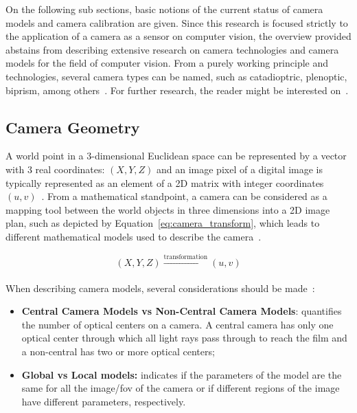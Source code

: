 On the following sub sections, basic notions of the current status of camera models and camera calibration are given. Since this research is focused strictly to the application of a camera as a sensor on computer vision, the overview provided abstains from describing extensive research on camera technologies and camera models for the field of computer vision. From a purely working principle and technologies, several camera types can be named, such as catadioptric, plenoptic, biprism, among others~\cite{Sturm2010}. %
For further research, the reader might be interested on~\cite{comercial_cameras, Sturm2010, camera_models, Merklinger1993, Photopillers}.


\subsection{Camera Geometry}
\label{subsec:sota:camera-geometry}
A world point in a 3-dimensional Euclidean space can be represented by a vector with 3 real coordinates: $(X, Y, Z)$ and an image pixel of a digital image is typically represented as an element of a 2D matrix with integer coordinates $(u, v)$~\cite{mvg_book}. From a mathematical standpoint, a camera can be considered as a mapping tool between the world objects in three dimensions into a 2D image plan, such as depicted by Equation~\eqref{eq:camera_transform}, which leads to different mathematical models used to describe the camera~\cite{mvg_book, Sturm2010}.

\begin{equation}
	\label{eq:camera_transform}
	(X, Y, Z) \xrightarrow[]{\text{transformation}} (u, v)
\end{equation}

When describing camera models, several considerations should be made~\cite{Sturm2010}:
\begin{itemize}
	\item \textbf{Central Camera Models vs Non-Central Camera Models}: quantifies the number of optical centers on a camera. A central camera has only one optical center through which all light rays pass through to reach the film and a non-central has two or more optical centers;
	\item \textbf{Global vs Local models:} indicates if the parameters of the model are the same for all the image/\ac{fov} of the camera or if different regions of the image have different parameters, respectively.
\end{itemize}

